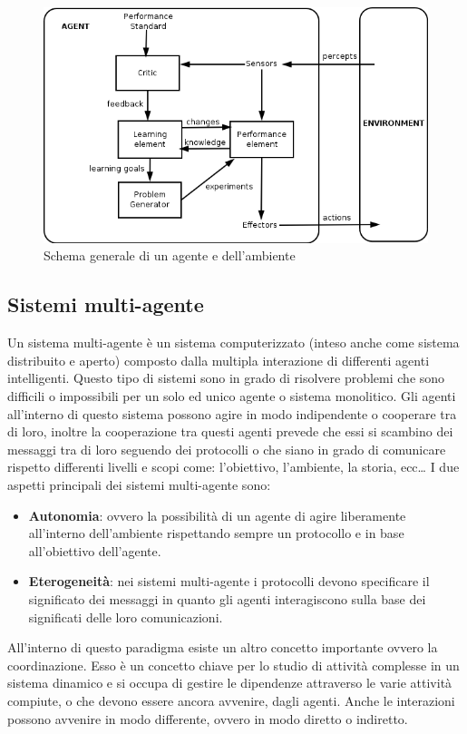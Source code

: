 \begin{figure}[H]
    \centering
    \includegraphics[width=.7\textwidth]{resources/schema_agente.png}
    \caption{Schema generale di un agente e dell'ambiente} 
\end{figure}

\subsection{Sistemi multi-agente}
Un sistema multi-agente è un sistema computerizzato (inteso anche come sistema distribuito e aperto) composto dalla multipla interazione di differenti agenti intelligenti. Questo tipo di sistemi sono in grado di risolvere problemi che sono difficili o impossibili per un solo ed unico agente o sistema monolitico.
Gli agenti all'interno di questo sistema possono agire in modo indipendente o cooperare tra di loro, inoltre la cooperazione tra questi agenti prevede che essi si scambino dei messaggi tra di loro seguendo dei protocolli o che siano in grado di comunicare rispetto differenti livelli e scopi come: l'obiettivo, l'ambiente, la storia, ecc…
I due aspetti principali dei sistemi multi-agente sono:
\begin{itemize}
    \item \textbf{Autonomia}: ovvero la possibilità di un agente di agire liberamente all'interno dell'ambiente rispettando sempre un protocollo e in base all'obiettivo dell'agente.
    \item \textbf{Eterogeneità}: nei sistemi multi-agente i protocolli devono specificare il significato dei messaggi in quanto gli agenti interagiscono sulla base dei significati delle loro comunicazioni.
\end{itemize}

All'interno di questo paradigma esiste un altro concetto importante ovvero la coordinazione. Esso è un concetto chiave per lo studio di attività complesse in un sistema dinamico e si occupa di gestire le dipendenze attraverso le varie attività compiute, o che devono essere ancora avvenire, dagli agenti.
Anche le interazioni possono avvenire in modo differente, ovvero in modo diretto o indiretto.

